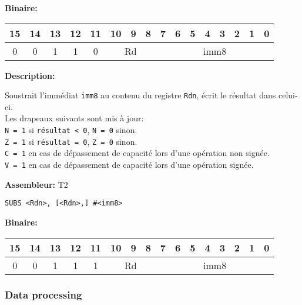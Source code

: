 \documentclass{article}
\begin{document}
    \textbf{Binaire:}

    \begin{tabular}{| c c c c c c c c c c c c c c c c |}
        \hline
        15 & 14 & 13 & \multicolumn{1}{|c}{12} & 11 & \multicolumn{1}{|c}{10} & 9 & 8 & \multicolumn{1}{|c}{7} & 6 & 5 & 4 & 3 & 2 & 1 & 0 \\
        \hline
        0 & 0 & 1 & \multicolumn{1}{|c}{1} & 0 & \multicolumn{3}{|c|}{Rd} & \multicolumn{8}{|c|}{imm8} \\
        \hline
    \end{tabular}


    \textbf{Description: }

    Soustrait l'immédiat \texttt{imm8} au contenu du registre \texttt{Rdn}, écrit le résultat dans celui-ci.\\
    Les drapeaux suivants sont mis à jour:\\
    \texttt{N = 1} si \texttt{résultat < 0}, \texttt{N = 0} sinon.\\
    \texttt{Z = 1} si \texttt{résultat = 0}, \texttt{Z = 0} sinon.\\
    \texttt{C = 1} en cas de dépassement de capacité lors d'une opération non signée.\\
    \texttt{V = 1} en cas de dépassement de capacité lors d'une opération signée.

    \textbf{Assembleur:} T2

    \begin{lstlisting}
SUBS <Rdn>, [<Rdn>,] #<imm8>
    \end{lstlisting}

    \textbf{Binaire:}

    \begin{tabular}{| c c c c c c c c c c c c c c c c |}
        \hline
        15 & 14 & 13 & \multicolumn{1}{|c}{12} & 11 & \multicolumn{1}{|c}{10} & 9 & 8 & \multicolumn{1}{|c}{7} & 6 & 5 & 4 & 3 & 2 & 1 & 0 \\
        \hline
        0 & 0 & 1 & \multicolumn{1}{|c}{1} & 1 & \multicolumn{3}{|c|}{Rd} & \multicolumn{8}{|c|}{imm8} \\
        \hline
    \end{tabular}

    \subsubsection{Data processing}
    \label{subsubsec:DataProc}
\end{document}
